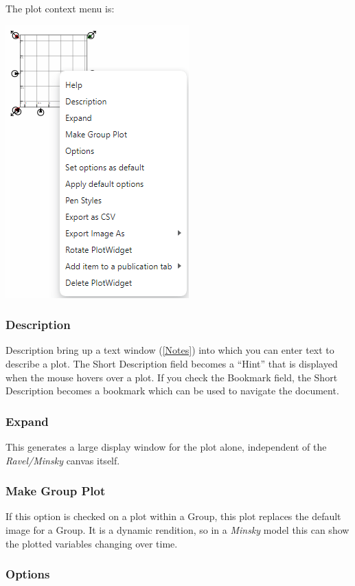 The plot context menu is:

\includegraphics{images/PlotContextMenu}

\subsubsection{Description}

Description bring up a text window (\ref{Notes}) into which you can
enter text to describe a plot. The Short Description field becomes
a ``Hint'' that is displayed when the mouse hovers over a plot.
If you check the Bookmark field, the Short Description becomes a bookmark
which can be used to navigate the document.

\subsubsection{Expand}

This generates a large display window for the plot alone, independent
of the \emph{Ravel/Minsky} canvas itself.

\subsubsection{Make Group Plot}

If this option is checked on a plot within a Group, this plot replaces
the default image for a Group. It is a dynamic rendition, so in a
\emph{Minsky} model this can show the plotted variables changing over
time.

\subsubsection{Options}

